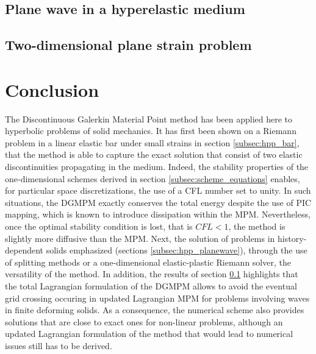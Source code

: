 \subsection{Plane wave in a hyperelastic medium}
\label{subsec:he_planewave}



\subsection{Two-dimensional plane strain problem}


\label{subsec:he_plate}




\section{Conclusion}
The Discontinuous Galerkin Material Point method has been applied here to hyperbolic problems of solid mechanics.
It has first been shown on a Riemann problem in a linear elastic bar under small strains in section \ref{subsec:hpp_bar}, that the method is able to capture the exact solution that consist of two elastic discontinuities propagating in the medium.
Indeed, the stability properties of the one-dimensional schemes derived in section \ref{subsec:scheme_equations} enables, for particular space discretizations, the use of a CFL number set to unity.
In such situations, the DGMPM exactly conserves the total energy despite the use of PIC mapping, which is known to introduce dissipation within the MPM.
Nevertheless, once the optimal stability condition is lost, that is $CFL <1$, the method is slightly more diffusive than the MPM.
Next, the solution of problems in history-dependent solids emphasized (sections \ref{subsec:hpp_planewave}), through the use of splitting methods or a one-dimensional elastic-plastic Riemann solver, the versatility of the method.
In addition, the results of section \ref{subsec:he_planewave} highlights that the total Lagrangian formulation of the DGMPM allows to avoid the eventual grid crossing occuring in updated Lagrangian MPM for problems involving waves in finite deforming solids.
As a consequence, the numerical scheme also provides solutions that are close to exact ones for non-linear problems, although an updated Lagrangian formulation of the method that would lead to numerical issues still has to be derived. 

